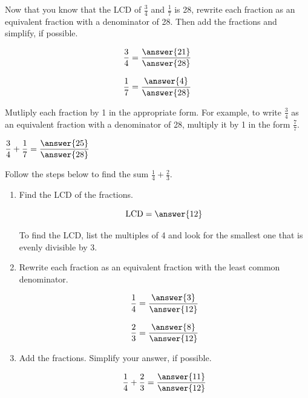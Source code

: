 \documentclass{ximera}
\begin{document}
\begin{problem}
Now that you know that the LCD of $\frac{3}{4}$ and $\textstyle \frac{1}{7}$ is 28, rewrite each fraction as an equivalent
fraction with a denominator of 28. Then add the fractions and simplify, if possible.

\[ \frac{3}{4} = \frac{\answer{21}}{\answer{28}} \]

\[ \frac{1}{7} = \frac{\answer{4}}{\answer{28}} \]


\begin{hint}
Mutliply each fraction by 1 in the appropriate form.  For example, to write $\frac{3}{4}$ as an equivalent fraction with a denominator
of 28, multiply it by 1 in the form $\frac{7}{7}.$
\end{hint}


$\displaystyle \frac{3}{4} + \frac{1}{7} = \frac{\answer{25}}{\answer{28}} $
\end{problem}



\begin{problem}
Follow the steps below to find the sum $\frac{1}{4} + \frac{2}{3}.$

\begin{enumerate}
\item Find the LCD of the fractions.

\[ \textrm{LCD} = \answer{12} \]

    \begin{hint}
      To find the LCD, list the multiples of 4 and look for the smallest one that is evenly divisible by 3.
    \end{hint}

\item Rewrite each fraction as an equivalent fraction with the least common denominator.

\[ \frac{1}{4} = \frac{\answer{3}}{\answer{12}} \]

\[ \frac{2}{3} = \frac{\answer{8}}{\answer{12}} \]


\item Add the fractions.  Simplify your answer, if possible.

\[ \frac{1}{4} + \frac{2}{3} = \frac{\answer{11}}{\answer{12}} \]

\end{enumerate}
\end{problem}
\end{document}
